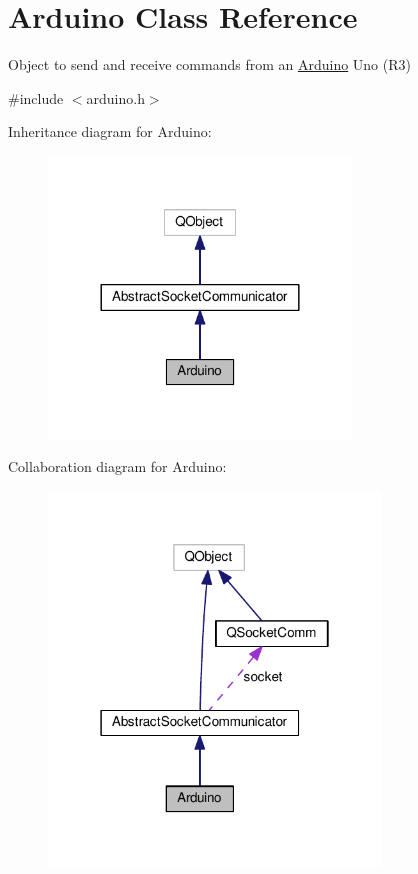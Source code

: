 \hypertarget{class_arduino}{}\section{Arduino Class Reference}
\label{class_arduino}


Object to send and receive commands from an \hyperlink{class_arduino}{Arduino} Uno (R3)  




{\ttfamily \#include $<$arduino.\+h$>$}



Inheritance diagram for Arduino\+:\nopagebreak
\begin{figure}[H]
\begin{center}
\leavevmode
\includegraphics[width=228pt]{class_arduino__inherit__graph}
\end{center}
\end{figure}


Collaboration diagram for Arduino\+:\nopagebreak
\begin{figure}[H]
\begin{center}
\leavevmode
\includegraphics[width=250pt]{class_arduino__coll__graph}
\end{center}
\end{figure}
